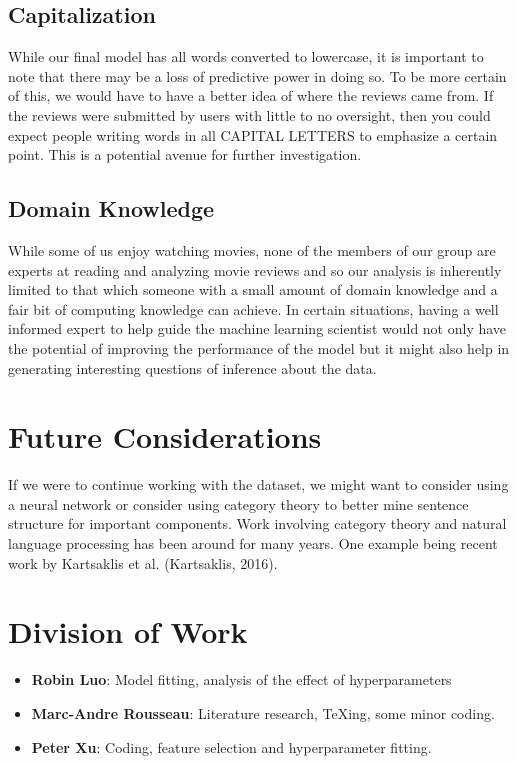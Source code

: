 \documentclass{amsart}
\theoremstyle{definition}
\theoremstyle{remark}
\numberwithin{equation}{section}
\begin{document}
\subsection{Capitalization}
While our final model has all words converted to lowercase, it is important to note that there may be a loss of predictive power in doing so.  To be more certain of this, we would have to have a better idea of where the reviews came from.  If the reviews were submitted by users with little to no oversight, then you could expect people writing words in all CAPITAL LETTERS to emphasize a certain point.  This is a potential avenue for further investigation.
\subsection{Domain Knowledge}
While some of us enjoy watching movies, none of the members of our group are experts at reading and analyzing movie reviews and so our analysis is inherently limited to that which someone with a small amount of domain knowledge and a fair bit of computing knowledge can achieve.  In certain situations, having a well informed expert to help guide the machine learning scientist would not only have the potential of improving the performance of the model but it might also help in generating interesting questions of inference about the data.
\section{Future Considerations}
If we were to continue working with the dataset, we might want to consider using a neural network or consider using category theory to better mine sentence structure for important components.  Work involving category theory and natural language processing has been around for many years.  One example being recent work by Kartsaklis et al. (Kartsaklis, 2016).
\section{Division of Work}
\begin{itemize}
\item{\textbf{Robin Luo}}: Model fitting, analysis of the effect of hyperparameters
\item{\textbf{Marc-Andre Rousseau}}: Literature research, TeXing, some minor coding.
\item{\textbf{Peter Xu}}: Coding, feature selection and hyperparameter fitting.
\end{itemize}
\end{document}
